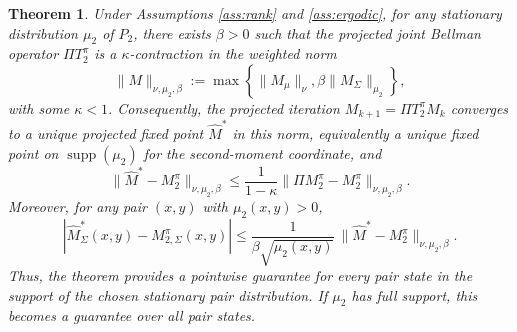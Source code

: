 \documentclass[accepted]{uai2026}
\theoremstyle{plain}
\newtheorem{theorem}{Theorem}[section]
\theoremstyle{definition}
\theoremstyle{remark}
\newcommand{\1}{\mathbbm{1}}
\begin{document}
\begin{theorem}
Under Assumptions \ref{ass:rank} and \ref{ass:ergodic}, for any stationary distribution $\mu_2$ of $P_2$, there exists $\beta > 0$ such that the projected joint Bellman operator $\Pi T^\pi_2$ is a $\kappa$-contraction in the weighted norm
\begin{equation}
\|M\|_{\nu,\mu_2,\beta} := \max\left\{\|M_\mu\|_\nu,\beta\|M_\Sigma\|_{\mu_2}\right\},
\end{equation}
with some $\kappa < 1$. Consequently, the projected iteration $M_{k+1} = \Pi T^\pi_2M_k$ converges to a unique projected fixed point $\hat{M}^\ast$ in this norm, equivalently a unique fixed point on $\operatorname{supp}(\mu_2)$ for the second-moment coordinate, and
\begin{equation}
\|\hat{M}^\ast - M^\pi_2\|_{\nu,\mu_2,\beta} \le \frac{1}{1-\kappa} \|\Pi M^\pi_2 - M^\pi_2\|_{\nu,\mu_2,\beta}.
\end{equation}
Moreover, for any pair $(x,y)$ with $\mu_2(x,y) > 0$,
\begin{equation}
\left|\hat{M}^\ast_\Sigma(x,y) - M^\pi_{2,\Sigma}(x,y)\right| \le \frac{1}{\beta\sqrt{\mu_2(x,y)}}\, \|\hat{M}^\ast - M^\pi_2\|_{\nu,\mu_2,\beta}.
\end{equation}
Thus, the theorem provides a pointwise guarantee for every pair state in the support of the chosen stationary pair distribution. If $\mu_2$ has full support, this becomes a guarantee over all pair states.
\end{theorem}
\end{document}
